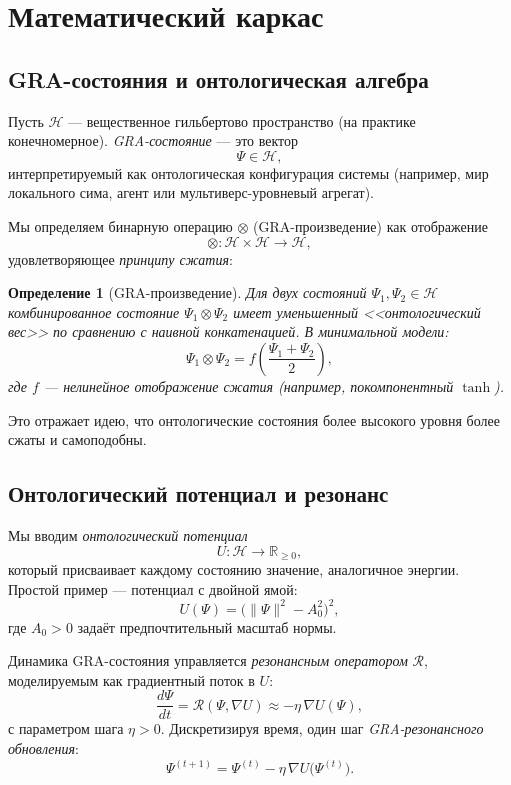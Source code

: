 \documentclass[11pt,a4paper]{article}
\newtheorem{definition}{Определение}
\begin{document}
\section{Математический каркас}

\subsection{GRA-состояния и онтологическая алгебра}
Пусть $\mathcal{H}$ --- вещественное гильбертово пространство
(на практике конечномерное).
\emph{GRA-состояние} --- это вектор
\[
  \Psi \in \mathcal{H},
\]
интерпретируемый как онтологическая конфигурация системы
(например, мир локального сима, агент
или мультиверс-уровневый агрегат).

Мы определяем бинарную операцию $\otimes$ (GRA-произведение)
как отображение
\[
  \otimes: \mathcal{H} \times \mathcal{H} \to \mathcal{H},
\]
удовлетворяющее \emph{принципу сжатия}:
\begin{definition}[GRA-произведение]
Для двух состояний $\Psi_1, \Psi_2 \in \mathcal{H}$
комбинированное состояние $\Psi_1 \otimes \Psi_2$
имеет уменьшенный <<онтологический вес>>
по сравнению с наивной конкатенацией.
В минимальной модели:
\[
  \Psi_1 \otimes \Psi_2
  = f\!\left(\frac{\Psi_1 + \Psi_2}{2}\right),
\]
где $f$ --- нелинейное отображение сжатия
(например, покомпонентный $\tanh$).
\end{definition}
Это отражает идею, что онтологические состояния более высокого уровня
более сжаты и самоподобны.

\subsection{Онтологический потенциал и резонанс}
Мы вводим \emph{онтологический потенциал}
\[
  U: \mathcal{H} \to \mathbb{R}_{\ge 0},
\]
который присваивает каждому состоянию значение,
аналогичное энергии.
Простой пример --- потенциал с двойной ямой:
\begin{equation}
  U(\Psi) = \bigl(\|\Psi\|^2 - A_0^2\bigr)^2,
  \label{eq:double-well}
\end{equation}
где $A_0 > 0$ задаёт предпочтительный масштаб нормы.

Динамика GRA-состояния управляется \emph{резонансным оператором}
$\mathcal{R}$, моделируемым как градиентный поток в $U$:
\begin{equation}
  \frac{d\Psi}{dt}
  = \mathcal{R}(\Psi, \nabla U)
  \approx -\eta \, \nabla U(\Psi),
  \label{eq:resonance}
\end{equation}
с параметром шага $\eta > 0$.
Дискретизируя время, один шаг \emph{GRA-резонансного обновления}:
\begin{equation}
  \Psi^{(t+1)} = \Psi^{(t)} - \eta \, \nabla U\bigl(\Psi^{(t)}\bigr).
  \label{eq:discrete-resonance}
\end{equation}
\end{document}
